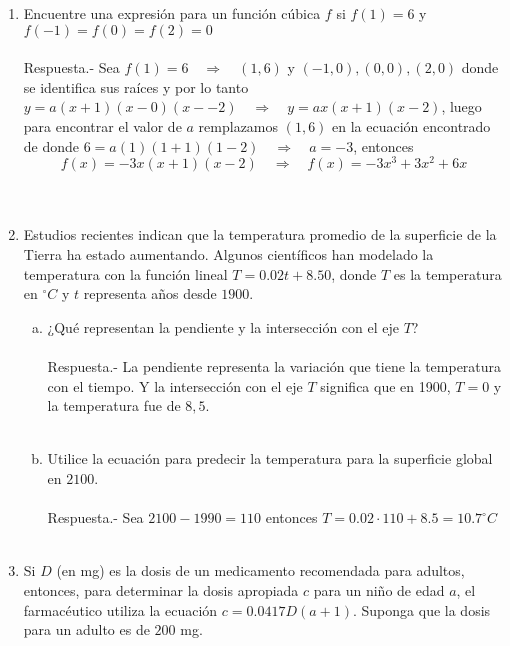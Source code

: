 \begin{enumerate}
    \item Encuentre una expresión para un función cúbica $f$ si $f(1)=6$ y $f(-1)=f(0)=f(2)=0$\\\\
	Respuesta.-\; Sea $f(1)=6 \quad \Rightarrow \quad (1,6)$ y $(-1,0), (0,0), (2,0)$ donde se identifica sus raíces y por lo tanto $y=a(x+1)(x-0)(x--2) \quad \Rightarrow \quad y=ax(x+1)(x-2)$, luego para encontrar el valor de $a$ remplazamos $(1,6)$ en la ecuación encontrado de donde $6=a(1)(1+1)(1-2) \quad \Rightarrow \quad a=-3$, entonces $$f(x)=-3x(x+1)(x-2) \quad \Rightarrow \quad f(x)=-3x^3+3x^2+6x$$\\\\

    \item Estudios recientes indican que la temperatura promedio de la superficie de la Tierra ha estado aumentando. Algunos científicos han modelado la temperatura con la función lineal $T =0.02t+8.50$, donde $T$ es la temperatura en $^{\circ}C$ y $t$ representa años desde $1900$.
    \begin{enumerate}[(a)]
	
	\item ¿Qué representan la pendiente y la intersección con el eje $T$?\\\\
	    Respuesta.-\; La pendiente representa la variación que tiene la temperatura con el tiempo. Y la intersección con el eje $T$ significa que en 1900, $T=0$ y la temperatura fue de $8,5$.\\\\
	
	\item Utilice la ecuación para predecir la temperatura para la superficie global en $2100$.\\\\
	    Respuesta.-\; Sea $2100-1990=110$ entonces $T=0.02\cdot 110 + 8.5 = 10.7 ^{\circ}C$\\\\

    \end{enumerate}

    \item  Si $D$ (en mg) es la dosis de un medicamento recomendada para adultos, entonces, para determinar la dosis apropiada $c$ para un niño de edad $a$, el farmacéutico utiliza la ecuación $c = 0.0417 D (a + 1)$. Suponga que la dosis para un adulto es de $200$ mg. 
    \begin{enumerate}[\bfseries (a)]
	

\end{enumerate}
\end{enumerate}
